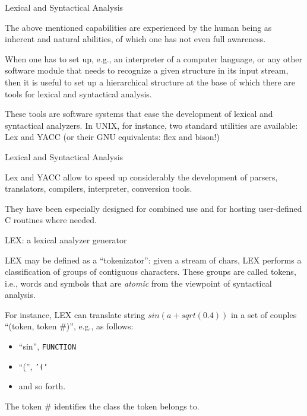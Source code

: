 \begin{frame}[fragile]{Lexical and Syntactical Analysis}

The above mentioned capabilities are experienced by the human being
as inherent and natural abilities, of which one has not even full
awareness.


\vspace{20pt}

When one has to set up, e.g., an interpreter of a computer language,
or any other software module that needs to recognize a given
structure in its input stream, then it is useful to set up
a hierarchical structure at the base of which there are tools
for lexical and syntactical analysis.


\vspace{20pt}

These tools are software systems that ease the development of
lexical and syntactical analyzers. In UNIX, for instance,
two standard utilities are available: Lex and YACC
(or their GNU equivalents: flex and bison!)

\end{frame}
\begin{frame}[fragile]{Lexical and Syntactical Analysis}

Lex and YACC allow to speed up considerably the development
of parsers, translators, compilers, interpreter, conversion tools.


\vspace{20pt}

They have been especially designed for combined use and for
hosting user-defined C routines where needed.

\end{frame}
\begin{frame}[fragile]{LEX: a lexical analyzer generator}

LEX may be defined as a ``tokenizator'': given a stream of
chars, LEX performs a classification of groups of contiguous
characters. These groups are called tokens, i.e., words and
symbols that are \emph{atomic\/} from the viewpoint of
syntactical analysis.


\vspace{20pt}

For instance, LEX can translate string
$ sin (a+sqrt(0.4)) $
in a set of couples ``(token, token \#)'', e.g., as follows:
\begin{itemize}
\item ``sin'', {\tt FUNCTION}
\item ``('', {\tt '('}        
\item and so forth.
\end{itemize}


\vspace{20pt}

The token \# identifies the class the token belongs to.

\end{frame}
